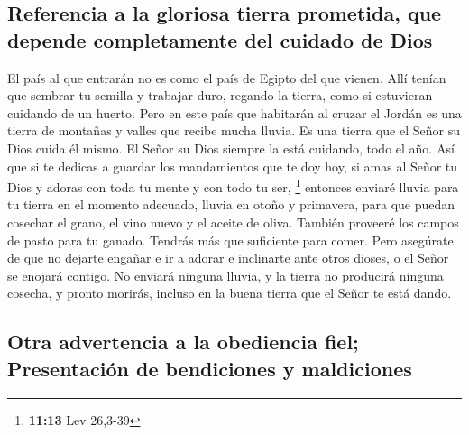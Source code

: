 \hypertarget{referencia-a-la-gloriosa-tierra-prometida-que-depende-completamente-del-cuidado-de-dios}{%
\subsection{Referencia a la gloriosa tierra prometida, que depende
completamente del cuidado de
Dios}\label{referencia-a-la-gloriosa-tierra-prometida-que-depende-completamente-del-cuidado-de-dios}}

 El país al que entrarán no es como el país de Egipto del
que vienen. Allí tenían que sembrar tu semilla y trabajar duro, regando
la tierra, como si estuvieran cuidando de un huerto. 
Pero en este país que habitarán al cruzar el Jordán es una tierra de
montañas y valles que recibe mucha lluvia.  Es una tierra
que el Señor su Dios cuida él mismo. El Señor su Dios siempre la está
cuidando, todo el año.  Así que si te dedicas a guardar
los mandamientos que te doy hoy, si amas al Señor tu Dios y adoras con
toda tu mente y con todo tu ser, \footnote{\textbf{11:13} Lev 26,3-39}
 entonces enviaré lluvia para tu tierra en el momento
adecuado, lluvia en otoño y primavera, para que puedan cosechar el
grano, el vino nuevo y el aceite de oliva.  También
proveeré los campos de pasto para tu ganado. Tendrás más que suficiente
para comer.  Pero asegúrate de que no dejarte engañar e
ir a adorar e inclinarte ante otros dioses,  o el Señor
se enojará contigo. No enviará ninguna lluvia, y la tierra no producirá
ninguna cosecha, y pronto morirás, incluso en la buena tierra que el
Señor te está dando.

\hypertarget{otra-advertencia-a-la-obediencia-fiel-presentaciuxf3n-de-bendiciones-y-maldiciones}{%
\subsection{Otra advertencia a la obediencia fiel; Presentación de
bendiciones y
maldiciones}\label{otra-advertencia-a-la-obediencia-fiel-presentaciuxf3n-de-bendiciones-y-maldiciones}}

